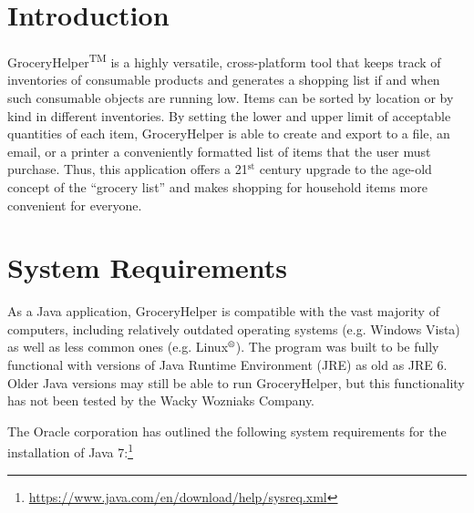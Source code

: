 \documentclass[letterpaper,12pt]{article}
\begin{document}
\pagebreak

\thispagestyle{plain}
\setcounter{page}{2}

\tableofcontents

\pagebreak







\pagebreak


\pagestyle{fancy}


\section{Introduction}

GroceryHelper{\footnotesize\textsuperscript{TM}} is a highly versatile, cross-platform tool that keeps track of inventories of consumable products and generates a shopping list if and when such consumable objects are running low. Items can be sorted by location or by kind in different inventories. By setting the lower and upper limit of acceptable quantities of each item, GroceryHelper is able to create and export to a file, an email, or a printer a conveniently formatted list of items that the user must purchase. Thus, this application offers a 21$^\text{st}$ century upgrade to the age-old concept of the ``grocery list'' and makes shopping for household items more convenient for everyone.



\section{System Requirements}
As a Java application, GroceryHelper is compatible with the vast majority of computers, including relatively outdated operating systems (e.g. Windows Vista) as well as less common ones (e.g. Linux$^\text{\textregistered}$). The program was built to be fully functional with versions of Java Runtime Environment (JRE) as old as JRE 6. Older Java versions may still be able to run GroceryHelper, but this functionality has not been tested by the Wacky Wozniaks Company.



The Oracle corporation has outlined the following system requirements for the installation of Java 7:\footnote{\url{https://www.java.com/en/download/help/sysreq.xml}}
\end{document}
